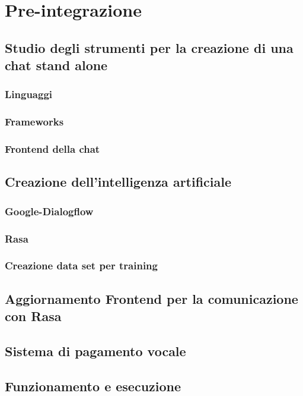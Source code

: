 \chapter{Pre-integrazione}

\section{Studio degli strumenti per la creazione di una chat stand alone}

\subsection{Linguaggi}

\subsection{Frameworks}

\subsection{Frontend della chat}

\section{Creazione dell'intelligenza artificiale}

\subsection{Google-Dialogflow}

\subsection{Rasa}

\subsection{Creazione data set per training}

\section{Aggiornamento Frontend per la comunicazione con Rasa}

\section{Sistema di pagamento vocale}

\section{Funzionamento e esecuzione}